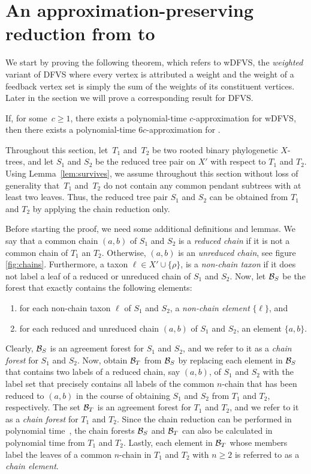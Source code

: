 \section{An approximation-preserving reduction from \mh to \dfvs}\label{sec:2dfvs}

We start by proving the following theorem, which refers to {\sc wDFVS}, the \emph{weighted} variant of {\sc DFVS} where every vertex is attributed a weight and the weight of a feedback vertex set is simply the sum of the weights of its constituent vertices. Later in the section we will prove a corresponding result for {\sc DFVS}.

\begin{theorem}\label{t:Hybrid2DFVS} If, for some~$c\geq 1$, there exists a polynomial-time $c$-approximation for {\sc wDFVS}, then there exists a polynomial-time $6c$-approximation for \mh.
\end{theorem}

Throughout this section, let~$T_1$ and~$T_2$ be two rooted binary phylogenetic $X$-trees, and let $S_1$ and $S_2$ be the reduced tree pair on $X'$ with respect to $T_1$ and $T_2$. Using Lemma~\ref{lem:survives}, we assume throughout this section without loss of generality that~$T_1$ and~$T_2$ do not contain any common pendant subtrees with at least two leaves. Thus, the reduced tree pair $S_1$ and $S_2$ can be obtained from $T_1$ and $T_2$ by applying the chain reduction only.

Before starting the proof, we need some additional definitions and lemmas. We say that a common chain $(a,b)$ of $S_1$ and $S_2$ is a {\it reduced chain} if it is not a common chain of $T_1$ an $T_2$. Otherwise, $(a,b)$ is an {\it unreduced chain}, see figure \ref{fig:chains}. Furthermore, a taxon $\ell\in X'\cup\{\rho\}$, is a {\it non-chain taxon} if it does not label a leaf of a reduced or unreduced chain of $S_1$ and $S_2$. Now, let ${\mathcal B}_S$ be the forest that exactly contains the following elements:
\begin{enumerate}
\item for each non-chain taxon $\ell$ of $S_1$ and $S_2$, a {\it non-chain element} $\{\ell\}$, and
\item for each reduced and unreduced chain $(a,b)$ of $S_1$ and $S_2$, an element $\{a,b\}$.
\end{enumerate}
Clearly, ${\mathcal B}_S$ is an agreement forest for $S_1$ and $S_2$, and we refer to it as a {\it chain forest} for $S_1$ and $S_2$.
Now, obtain ${\mathcal B}_T$ from ${\mathcal B}_S$ by replacing  each element in ${\mathcal B}_S$ that contains two labels of a reduced chain, say $(a,b)$, of $S_1$ and $S_2$ with the label set that precisely contains all labels of the common $n$-chain that has been reduced to $(a,b)$ in the course of obtaining $S_1$ and $S_2$ from $T_1$ and $T_2$, respectively. The set ${\mathcal B}_T$ is an agreement forest for $T_1$ and $T_2$, and we refer to it as a {\it chain forest} for  $T_1$ and $T_2$. Since the chain reduction can be performed in polynomial time~\cite{bordewich07b}, the chain forests ${\mathcal B}_S$ and ${\mathcal B}_T$ can also be calculated in polynomial time from $T_1$ and $T_2$. Lastly, each element in ${\mathcal B}_T$ whose members label the leaves of a common $n$-chain in $T_1$ and $T_2$ with $n\geq 2$  is referred to as a {\it chain element}.

